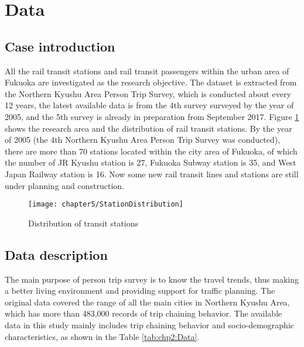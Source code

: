 %
\section{Data}
%
\subsection{Case introduction}
All the rail transit stations and rail transit passengers within the urban area of Fukuoka are investigated as the research objective. The dataset is extracted from the Northern Kyushu Area Person Trip Survey, which is conducted about every 12 years, the latest available data is from the 4th survey surveyed by the year of 2005, and the 5th survey is already in preparation from September 2017. Figure \ref{fig:chp2:StationDistribution} shows the research area and the distribution of rail transit stations. By the year of 2005 (the 4th Northern Kyushu Area Person Trip Survey was conducted), there are more than 70 stations located within the city area of Fukuoka, of which the number of JR Kyushu station is 27, Fukuoka Subway station is 35, and West Japan Railway station is 16. Now some new rail transit lines and stations are still under planning and construction. 

\begin{figure}[htbp]
	\centering
	\texttt{[image: chapter5/StationDistribution]}
	\caption{Distribution of transit stations}
	\label{fig:chp2:StationDistribution}
\end{figure}

%
\subsection{Data description}
The main purpose of person trip survey is to know the travel trends, thus making a better living environment and providing support for traffic planning. The original data covered the range of all the main cities in Northern Kyushu Area, which has more than 483,000 records of trip chaining behavior. The available data in this study mainly includes trip chaining behavior and socio-demographic characteristics, as shown in the Table \ref{tab:chp2:Data}.

